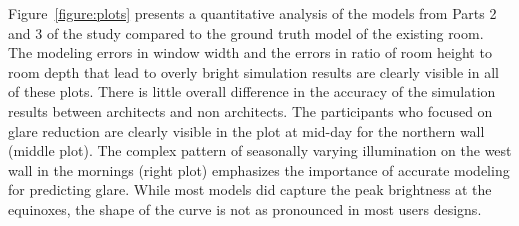 \documentclass{article}
\begin{document}
Figure~\ref{figure:plots} presents a quantitative analysis of the
models from Parts 2 and 3 of the study compared to the ground truth
model of the existing room.  The modeling errors in window width and
the errors in ratio of room height to room depth
that lead to overly bright simulation results are clearly visible in
all of these plots.  There is little overall difference in the
accuracy of the simulation results between architects and non
architects.  The participants who focused on glare reduction are
clearly visible in the plot at mid-day for the northern wall (middle
plot).  The complex pattern of seasonally varying illumination on the
west wall in the mornings (right plot) emphasizes the importance of
accurate modeling for predicting glare.  While most models did capture
the peak brightness at the equinoxes, the shape of the curve is not as
pronounced in most users designs.

\end{document}
